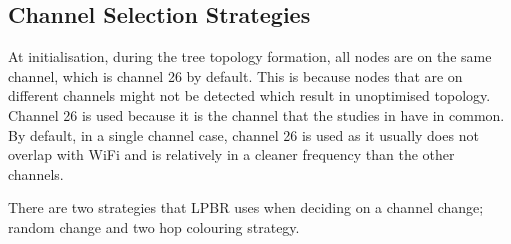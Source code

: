 

\subsection{Channel Selection Strategies}


At initialisation, during the tree topology formation, all nodes are on the same channel, which is channel 26 by default. This is because nodes that are on different channels might not be detected which result in unoptimised topology. Channel 26 is used because it is the channel that the studies in \cite{chrysso}\cite{micmac}\cite{watteyne} have in common. By default, in a single channel case, channel 26 is used as it usually does not overlap with WiFi and is relatively in a cleaner frequency than the other channels. 




There are two strategies that LPBR uses when deciding on a channel change; random change and two hop colouring strategy. 

